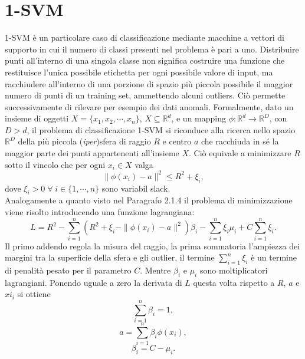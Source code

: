 \documentclass [11pt,a4paper,twoside,openright] {book}
\begin{document}
\section{1-SVM}
1-SVM è un particolare caso di classificazione mediante macchine a vettori di supporto in cui il numero di classi presenti nel problema è pari a uno. Distribuire punti all'interno di una singola classe non significa costruire una funzione che restituisce l'unica possibile etichetta per ogni possibile valore di input, ma racchiudere all'interno di una porzione di spazio più piccola possibile il maggior numero di punti di un training set, ammettendo alcuni outliers. Ciò permette successivamente di rilevare per esempio dei dati anomali. Formalmente, dato un insieme di oggetti $X = \lbrace x_1, x_2, \cdots, x_n \rbrace$, $X \subseteq \mathbb{R}^d$, e un mapping $\phi: \mathbb{R}^d \rightarrow \mathbb{R}^D$, con $D > d$, il problema di classificazione 1-SVM si riconduce alla ricerca nello spazio $\mathbb{R}^D$ della più piccola (\textit{iper})sfera di raggio $R$ e centro $a$ che racchiuda in sé la maggior parte dei punti appartenenti all'insieme $X$. Ciò equivale a minimizzare $R$ sotto il vincolo che per ogni $x_i \in X$ valga
\begin{equation}\label{sfera}
\parallel \phi(x_i) - a \parallel^2 \leq R^2 + \xi_i,
\end{equation}
dove $\xi_i > 0 \; \forall \; i \in \lbrace 1, \cdots, n \rbrace$  sono variabil slack.\\
Analogamente a quanto visto nel Paragrafo 2.1.4 il problema di minimizzazione viene risolto introducendo una funzione lagrangiana:
\begin{equation}
L = R^2 - \sum_{i=1}^n (R^2 + \xi_i - \parallel \phi(x_i) - a \parallel^2) \beta_i - \sum_{i=1}^n \xi_i \mu_i + C \sum_{i=1}^n \xi_i.
\end{equation}
Il primo addendo regola la misura del raggio, la prima sommatoria l'ampiezza dei margini tra la superficie della sfera e gli outlier, il termine $\sum_{i=1}^n\xi_i$ è un termine di penalità pesato per il parametro $C$. Mentre $\beta_i$ e $\mu_i$ sono moltiplicatori lagrangiani. Ponendo uguale a zero la derivata di $L$ questa volta rispetto a $R$, $a$ e $xi_i$ si ottiene
\begin{equation}\label{beta}
\sum_{i=1}^n \beta_i = 1,
\end{equation}
\begin{equation}\label{centro}
a = \sum_{i=1}^n \beta_i \phi(x_i),
\end{equation}
\begin{equation}\label{C}
\beta_i = C - \mu_i.
\end{equation}
\end{document}
